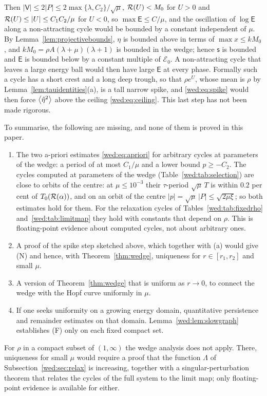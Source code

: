 Then $|\mathsf V|\le2|P|\le2\max\{\lambda,C_2\}/\sqrt\mu$, $\mathcal R(U)<M_0$ for $U>0$ and $\mathcal R(U)\le|U|\le C_1C_2/\mu$ for $U<0$, so $\max\mathsf E\le C/\mu$, and the oscillation of $\log\mathsf E$ along a non-attracting cycle would be bounded by a constant independent of $\mu$. By Lemma~\ref{lem:projectivebounds}, $\eta$ is bounded above in terms of $\max x\le kM_0$, and $kM_0=\rho A(\lambda+\mu)(\lambda+1)$ is bounded in the wedge; hence $\mathsf s$ is bounded and $\mathsf E$ is bounded below by a constant multiple of $\mathcal E_0$. A non-attracting cycle that leaves a large energy ball would then have large $\mathsf E$ at every phase. Formally such a cycle has a short crest and a long deep trough, so that $\rho e^U$, whose mean is $\rho$ by Lemma~\ref{lem:tauidentities}(a), is a tall narrow spike, and \eqref{wed:eq:spike} would then force $\left\langle \hat\eta^2\right\rangle$ above the ceiling \eqref{wed:eq:ceiling}. This last step has not been made rigorous.

To summarise, the following are missing, and none of them is proved in this paper.
\begin{enumerate}[label=\textup{(\alph*)}]
\item The two a-priori estimates \eqref{wed:eq:apriori} for arbitrary cycles at parameters of the wedge: a period of at most $C_1/\mu$ and a lower bound $p\ge-C_2$. The cycles computed at parameters of the wedge (Table~\ref{wed:tab:selection}) are close to orbits of the centre: at $\mu\le10^{-3}$ their $\tau$-period $\sqrt\mu\,T$ is within $0.2$ per cent of $T_0(\mathcal R(\alpha))$, and on an orbit of the centre $|p|=\sqrt\mu\,|P|\le\sqrt{2\mu\xi}$; so both estimates hold for them. For the relaxation cycles of Tables~\ref{wed:tab:fixedrho} and~\ref{wed:tab:limitmap} they hold with constants that depend on $\rho$. This is floating-point evidence about computed cycles, not about arbitrary ones.
\item A proof of the spike step sketched above, which together with (a) would give \textup{(N)} and hence, with Theorem~\ref{thm:wedge}, uniqueness for $r\in[r_1,r_2]$ and small $\mu$.
\item A version of Theorem~\ref{thm:wedge} that is uniform as $r\to0$, to connect the wedge with the Hopf curve uniformly in $\mu$.
\item If one seeks uniformity on a growing energy domain, quantitative persistence and remainder estimates on that domain. Lemma~\ref{wed:lem:slowgraph} establishes \textup{(F)} only on each fixed compact set.
\end{enumerate}
For $\rho$ in a compact subset of $(1,\infty)$ the wedge analysis does not apply. There, uniqueness for small $\mu$ would require a proof that the function $\Lambda$ of Subsection~\ref{wed:sec:relax} is increasing, together with a singular-perturbation theorem that relates the cycles of the full system to the limit map; only floating-point evidence is available for either.
